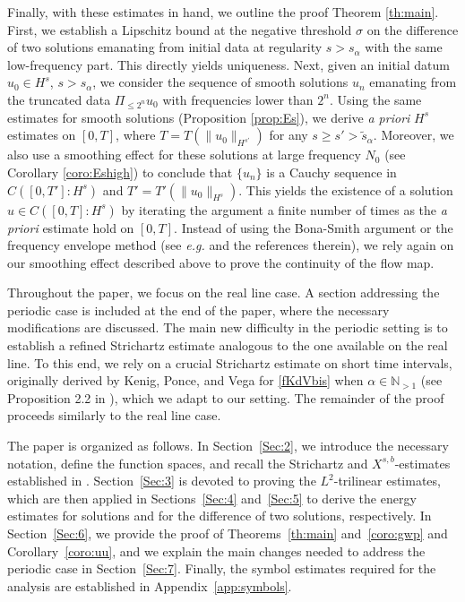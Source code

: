 \documentclass{amsart}
\theoremstyle{definition}
\theoremstyle{remark}
\newcommand{\N}{\mathbb{N}}
\numberwithin{equation}{section}
\begin{document}
 Finally, with these estimates in hand, we outline the proof Theorem \ref{th:main}. First, we establish a Lipschitz bound at the negative threshold $\sigma$ on the difference of two solutions emanating from initial data at regularity $s>s_{\alpha}$  with the same low-frequency part. This directly yields uniqueness. Next, given an initial datum  $u_0 \in H^s$, $s>s_\alpha$, we consider the sequence of smooth solutions $u_n$ emanating from the truncated data $\Pi_{\le 2^n} u_0$ with frequencies lower than $2^n$. Using the same estimates for smooth solutions (Proposition \ref{prop:Es}), we derive \emph{a priori} $H^s$ estimates on $[0,T]$, where $T = T(\|u_0\|_{H^{s'}})$ for any $s \ge s' > \widetilde{s}_\alpha$. Moreover, we also use a smoothing effect  for these solutions at large frequency $N_0$ (see Corollary \ref{coro:Eshigh}) to conclude that $\{u_n\}$ is a Cauchy sequence in $C([0,T'] : H^s)$ and $T'=T'(\|u_0\|_{H^{s}})$. This yields the existence of a solution $u \in C([0,T] : H^s)$ by iterating the argument a finite number of times as the \emph{a priori} estimate hold on $[0,T]$.  Instead of using the Bona-Smith argument \cite{bonasmith1975} or the frequency envelope method (see \emph{e.g.} \cite{ABITZ24} and the references therein), we rely again on our smoothing effect described above to prove the continuity of the flow map.
   
Throughout the paper, we focus on the real line case. A section addressing the periodic case is included at the end of the paper, where the necessary modifications are discussed. The main new difficulty in the periodic setting is to establish a refined Strichartz estimate analogous to the one available on the real line. To this end, we rely on a crucial Strichartz estimate on short time intervals, originally derived by Kenig, Ponce, and Vega for \eqref{fKdVbis} when $\alpha \in \N_{>1}$ (see Proposition 2.2 in \cite{KPV}), which we adapt to our setting. The remainder of the proof proceeds similarly to the real line case. 
\bigskip
\bigskip

 The paper is organized as follows. In Section~\ref{Sec:2}, we introduce the necessary notation, define the function spaces, and recall the Strichartz and $X^{s,b}$-estimates established in \cite{MPV}. Section~\ref{Sec:3} is devoted to proving the $L^2$-trilinear estimates, which are then applied in Sections~\ref{Sec:4} and~\ref{Sec:5} to derive the energy estimates for solutions and for the difference of two solutions, respectively. In Section~\ref{Sec:6}, we provide the proof of Theorems~\ref{th:main} and~\ref{coro:gwp} and Corollary~\ref{coro:uu}, and we explain the main changes needed to address the periodic case in Section~\ref{Sec:7}. Finally, the symbol estimates required for the analysis are established in Appendix~\ref{app:symbols}.
\end{document}
